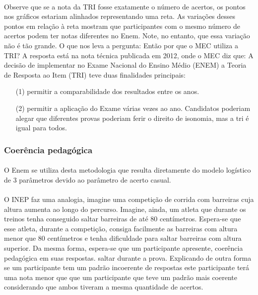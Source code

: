 	\paragraph{}
    	Observe que se a nota da TRI fosse exatamente o número de acertos, os pontos nos gráficos estariam alinhados representando uma reta. As variações desses pontos em relação à reta mostram que participantes com o mesmo número de acertos podem ter notas diferentes no Enem. Note, no entanto, que essa variação não é tão grande. O que nos leva a pergunta: Então por que o MEC utiliza a TRI? A resposta está na nota técnica publicada em 2012, onde o MEC diz que: A decisão de implementar no Exame Nacional do Ensino Médio (ENEM) a Teoria de Resposta ao Item (TRI) teve duas finalidades principais:
    \begin{enumerate}
        \item[(1)] permitir a comparabilidade dos resultados entre os anos.
        \item[(2)] permitir a aplicação do Exame várias vezes ao ano. Candidatos poderiam alegar que diferentes provas poderiam ferir o direito de isonomia, mas a tri é igual para todos.
    \end{enumerate}
    	     
	
	\subsubsection{Coerência pedagógica}
	\paragraph{}
	    O Enem se utiliza desta metodologia que resulta diretamente do modelo logístico de 3 parâmetros devido ao parâmetro de acerto casual.
	\paragraph{}
	    O INEP faz uma analogia, imagine uma competição de corrida com barreiras cuja altura aumenta ao longo do percurso. Imagine, ainda, um atleta que durante os treinos tenha conseguido saltar barreiras de até 80 centímetros. Espera-se que esse atleta, durante a competição, consiga facilmente as barreiras com altura menor que 80 centímetros e tenha dificuldade para saltar barreiras com altura superior. Da mesma forma, espera-se que um participante apresente, coerência pedagógica em suas respostas. saltar durante a prova. Explicando de outra forma se um participante tem um padrão incoerente de respostas este participante terá uma nota menor que que um participante que teve um padrão mais coerente considerando que ambos tiveram a mesma quantidade de acertos.
	
